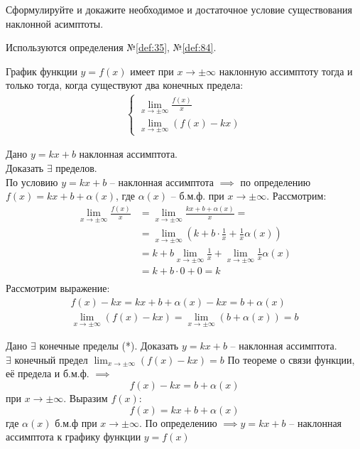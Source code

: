 \begin{question}
    Сформулируйте и докажите необходимое и достаточное условие существования наклонной асимптоты.
\end{question}
\begin{used}
    Используются определения №\ref{def:35}, №\ref{def:84}.
\end{used}
\begin{theorem}
    График функции $y = f(x)$ имеет при  $x \to \pm\infty$ наклонную ассимптоту тогда и только тогда, когда существуют два конечных предела:
    \begin{gather*}
        \begin{cases}
            \lim_{x \to \pm\infty} \frac{f(x)}{x} \\
            \lim_{x \to \pm\infty} (f(x) - kx)
        \end{cases} \tag{*} 
    \end{gather*}
\end{theorem}
\begin{necessity}
    Дано $y = kx + b$ наклонная ассимптота. \\
    Доказать  $\exists $ пределов.\\
    По условию $y = kx + b$ -- наклонная ассимптота  $\implies $ по определению $f(x) = kx + b + \alpha(x)$, где $\alpha(x)$ -- б.м.ф. при $x \to  \pm \infty$.
    Рассмотрим:
    \begin{align*}
        \lim_{x \to \pm\infty} \frac{f(x)}{x} &= \lim_{x \to \pm\infty} \frac{kx + b + \alpha(x)}{x} = \\
            &= \lim_{x \to \pm\infty} (k + b \cdot \frac{1}{x} + \frac{1}{x} \alpha(x)) \\
            &= k + b \lim_{x \to \pm\infty} \frac{1}{x} + \lim_{x \to \pm\infty}\frac{1}{x} \alpha(x) \\
            &= k + b\cdot 0 + 0 = k \\
    \end{align*}
    Рассмотрим выражение:
    \begin{align*}
        f(x) - kx = kx + b + \alpha(x) - kx = b + \alpha(x) \\
        \lim_{x \to \pm\infty} (f(x) - kx) = \lim_{x \to \pm\infty} (b + \alpha(x)) = b 
    \end{align*}
\end{necessity}
\begin{sufficiency}
    Дано $\exists $ конечные пределы (*). Доказать $y = kx + b$ -- наклонная ассимптота. \\
    $\exists $ конечный предел $\lim_{x \to \pm\infty} (f(x) - kx) = b$
    По теореме о связи функции, её предела и б.м.ф. $\implies$ \[
        f(x) - kx = b + \alpha(x)
    \]  при $x \to \pm\infty$. Выразим $f(x)$:  \[
        f(x) = kx + b + \alpha(x)
    \] где $\alpha(x)$ б.м.ф при $x \to \pm\infty$.
    По определению $\implies y = kx + b$ -- наклонная ассимптота к графику функции $y = f(x)$
\end{sufficiency}
\pagebreak



